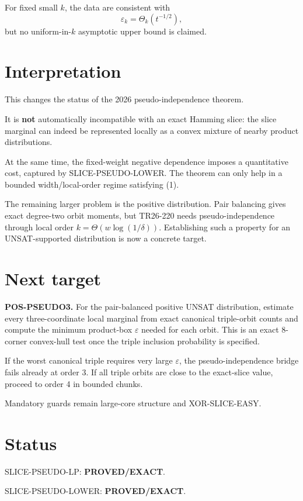 \documentclass[11pt]{article}
\begin{document}
For fixed small \(k\), the data are consistent with
\[
\varepsilon_k=\Theta_k(t^{-1/2}),
\]
but no uniform-in-\(k\) asymptotic upper bound is claimed.

\section{Interpretation}

This changes the status of the 2026 pseudo-independence theorem.

It is \textbf{not} automatically incompatible with an exact Hamming slice:
the slice marginal can indeed be represented locally as a convex mixture of
nearby product distributions.

At the same time, the fixed-weight negative dependence imposes a quantitative
cost, captured by SLICE-PSEUDO-LOWER. The theorem can only help in a bounded
width/local-order regime satisfying (1).

The remaining larger problem is the positive distribution. Pair balancing
gives exact degree-two orbit moments, but TR26-220 needs pseudo-independence
through local order \(k=\Theta(w\log(1/\delta))\). Establishing such a
property for an UNSAT-supported distribution is now a concrete target.

\section{Next target}

\textbf{POS-PSEUDO3.}
For the pair-balanced positive UNSAT distribution, estimate every
three-coordinate local marginal from exact canonical triple-orbit counts and
compute the minimum product-box \(\varepsilon\) needed for each orbit.
This is an exact 8-corner convex-hull test once the triple inclusion
probability is specified.

If the worst canonical triple requires very large \(\varepsilon\), the
pseudo-independence bridge fails already at order 3. If all triple orbits are
close to the exact-slice value, proceed to order 4 in bounded chunks.

Mandatory guards remain large-core structure and XOR-SLICE-EASY.

\section{Status}

SLICE-PSEUDO-LP: \textbf{PROVED/EXACT}.

SLICE-PSEUDO-LOWER: \textbf{PROVED/EXACT}.
\end{document}
